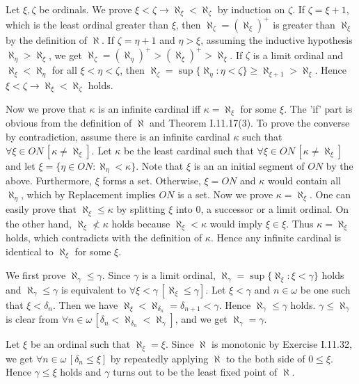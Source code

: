 \documentclass[12pt]{article}
\theoremstyle{definition}
\newenvironment{customthm}[1]
  {\renewcommand\theinnercustomthm{#1}\innercustomthm}
  {\endinnercustomthm}
\begin{document}
\begin{customthm}{I.11.30} Let $\xi,\zeta$ be ordinals. We prove $\xi<\zeta\rightarrow\aleph_\xi<\aleph_\zeta$ by induction on $\zeta$. If $\zeta=\xi+1$, which is the least ordinal greater than $\xi$, then $\aleph_\zeta=(\aleph_\xi)^+$ is greater than $\aleph_\xi$ by the definition of $\aleph$. If $\zeta=\eta+1$ and $\eta>\xi$, assuming the inductive hypothesis $\aleph_\eta>\aleph_\xi$, we get $\aleph_\zeta=(\aleph_\eta)^+>(\aleph_\xi)^+>\aleph_\xi$. If $\zeta$ is a limit ordinal and $\aleph_\xi<\aleph_\eta$ for all $\xi<\eta<\zeta$, then $\aleph_\zeta=\sup\{\aleph_\eta:\eta<\zeta\}\geq\aleph_{\xi+1}>\aleph_\xi$. Hence $\xi<\zeta\rightarrow\aleph_\xi<\aleph_\zeta$ holds.

Now we prove that $\kappa$ is an infinite cardinal iff $\kappa=\aleph_\xi$ for some $\xi$. The 'if' part is obvious from the definition of $\aleph$ and Theorem I.11.17(3). To prove the converse by contradiction, assume there is an infinite cardinal $\kappa$ such that $\forall\xi\in ON\,[\kappa\neq\aleph_\xi]$. Let $\kappa$ be the least cardinal such that $\forall\xi\in ON\,[\kappa\neq\aleph_\xi]$ and let $\xi=\{\eta\in ON:\aleph_\eta<\kappa\}$. Note that $\xi$ is an an initial segment of $ON$ by the above. Furthermore, $\xi$ forms a set. Otherwise, $\xi=ON$ and $\kappa$ would contain all $\aleph_\eta$, which by Replacement implies $ON$ is a set. Now we prove $\kappa=\aleph_\xi$. One can easily prove that $\aleph_\xi\leq\kappa$ by splitting $\xi$ into $0$, a successor or a limit ordinal. On the other hand, $\aleph_\xi\not<\kappa$ holds because $\aleph_\xi<\kappa$ would imply $\xi\in\xi$. Thus $\kappa=\aleph_\xi$ holds, which contradicts with the definition of $\kappa$. Hence any infinite cardinal is identical to $\aleph_\xi$ for some $\xi$.
\end{customthm}

\begin{customthm}{I.11.33} We first prove $\aleph_\gamma\leq\gamma$. Since $\gamma$ is a limit ordinal, $\aleph_\gamma=\sup\{\aleph_\xi:\xi<\gamma\}$ holds and $\aleph_\gamma\leq\gamma$ is equivalent to $\forall\xi<\gamma\,[\aleph_\xi\leq\gamma]$. Let $\xi<\gamma$ and $n\in\omega$ be one such that $\xi<\delta_n$. Then we have $\aleph_\xi<\aleph_{\delta_n}=\delta_{n+1}<\gamma$. Hence $\aleph_\gamma\leq\gamma$ holds. $\gamma\leq\aleph_\gamma$ is clear from $\forall n\in\omega\,[\delta_n<\aleph_{\delta_n}<\aleph_\gamma]$, and we get $\aleph_\gamma=\gamma$.

Let $\xi$ be an ordinal such that $\aleph_\xi=\xi$. Since $\aleph$ is monotonic by Exercise I.11.32, we get $\forall n\in\omega\,[\delta_n\leq\xi]$ by repeatedly applying $\aleph$ to the both side of $0\leq\xi$.  Hence $\gamma\leq\xi$ holds and $\gamma$ turns out to be the least fixed point of $\aleph$.
\end{customthm}
\end{document}
